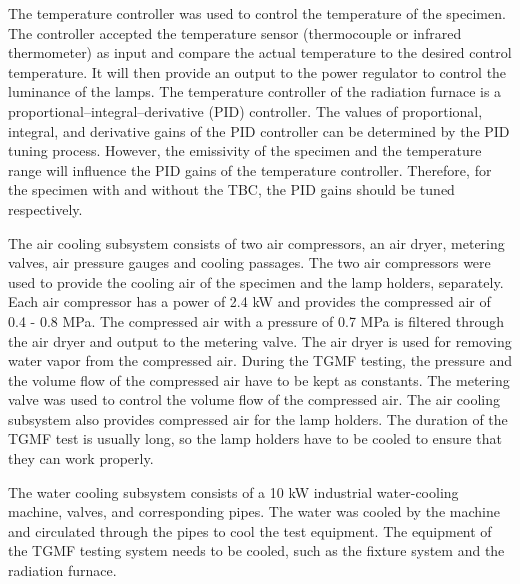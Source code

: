 The temperature controller was used to control the temperature of the specimen.
The controller accepted the temperature sensor (thermocouple or infrared thermometer) as input and compare the actual temperature to the desired control temperature. It will then provide an output to the power regulator to control the luminance of the lamps. 
The temperature controller of the radiation furnace is a proportional–integral–derivative (PID) controller. The values of proportional, integral, and derivative gains of the PID controller can be determined by the PID tuning process.
However, the emissivity of the specimen and the temperature range will influence the PID gains of the temperature controller. Therefore, for the specimen with and without the TBC, the PID gains should be tuned respectively.

The air cooling subsystem consists of two air compressors, an air dryer, metering valves, air pressure gauges and cooling passages. 
The two air compressors were used to provide the cooling air of the specimen and the lamp holders, separately.
Each air compressor has a power of 2.4 kW and provides the compressed air of 0.4 - 0.8 MPa. The compressed air with a pressure of 0.7 MPa is filtered through the air dryer and output to the metering valve. The air dryer is used for removing water vapor from the compressed air.
During the TGMF testing, the pressure and the volume flow of the compressed air have to be kept as constants. The metering valve was used to control the volume flow of the compressed air.
The air cooling subsystem also provides compressed air for the lamp holders.
The duration of the TGMF test is usually long, so the lamp holders have to be cooled to ensure that they can work properly.

The water cooling subsystem consists of a 10 kW industrial water-cooling machine, valves, and corresponding pipes. 
The water was cooled by the machine and circulated through the pipes to cool the test equipment. 
The equipment of the TGMF testing system needs to be cooled, such as the fixture system and the radiation furnace.




